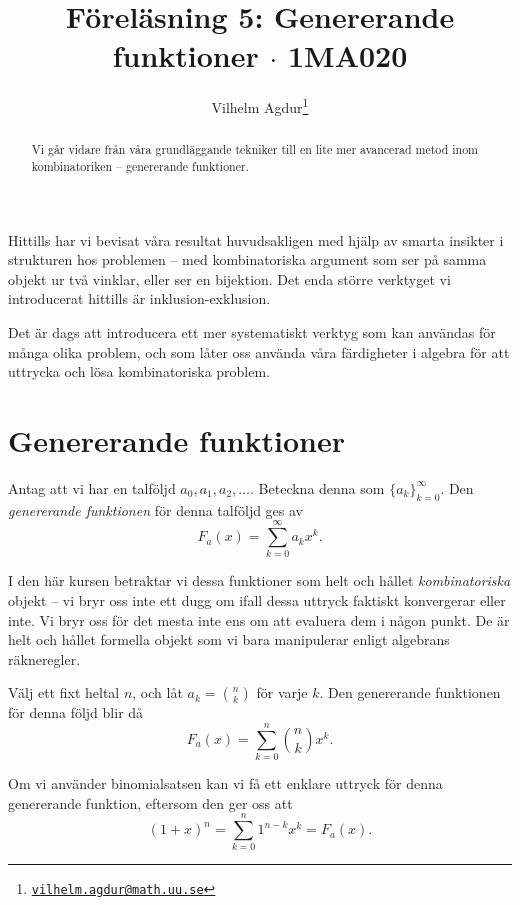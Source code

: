 \documentclass[nobib]{tufte-handout}
\title{Föreläsning 5: Genererande funktioner $\cdot$ 1MA020}
\author[Vilhelm Agdur]{Vilhelm Agdur\thanks{\href{mailto:vilhelm.agdur@math.uu.se}{\nolinkurl{vilhelm.agdur@math.uu.se}}}}
\begin{document}

\maketitle%

\begin{abstract}
\noindent
Vi går vidare från våra grundläggande tekniker till en lite mer avancerad metod inom kombinatoriken -- genererande funktioner.
\end{abstract}

Hittills har vi bevisat våra resultat huvudsakligen med hjälp av smarta insikter i strukturen hos problemen -- med kombinatoriska argument som ser på samma objekt ur två vinklar, eller ser en bijektion. Det enda större verktyget vi introducerat hittills är inklusion-exklusion.

Det är dags att introducera ett mer systematiskt verktyg som kan användas för många olika problem, och som låter oss använda våra färdigheter i algebra för att uttrycka och lösa kombinatoriska problem.

\section{Genererande funktioner}

\begin{definition}
    Antag att vi har en talföljd $a_0, a_1, a_2, \ldots$. Beteckna denna som $\{a_k\}_{k=0}^\infty$. Den \emph{genererande funktionen} för denna talföljd ges av
    $$F_{a}(x) = \sum_{k=0}^{\infty} a_k x^k.$$
\end{definition}

I den här kursen betraktar vi dessa funktioner som helt och hållet \emph{kombinatoriska} objekt -- vi bryr oss inte ett dugg om ifall dessa uttryck faktiskt konvergerar eller inte. Vi bryr oss för det mesta inte ens om att evaluera dem i någon punkt. De är helt och hållet formella objekt som vi bara manipulerar enligt algebrans räkneregler.

\begin{example}
    Välj ett fixt heltal $n$, och låt $a_k = \binom{n}{k}$ för varje $k$. Den genererande funktionen för denna följd blir då
    $$F_a(x) = \sum_{k=0}^{n}\binom{n}{k}x^k.$$

    Om vi använder binomialsatsen kan vi få ett enklare uttryck för denna genererande funktion, eftersom den ger oss att
    $$(1+x)^n = \sum_{k= 0}^{n}1^{n-k}x^k = F_a(x).$$
\end{example}
\end{document}

